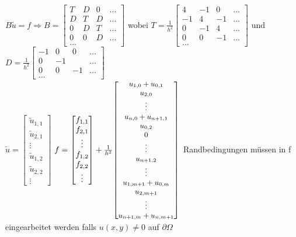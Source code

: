 $B \tilde{u} = f \Rightarrow B= \begin{bmatrix}
    T & D & 0 & \ldots \\
    D & T & D & \ldots \\
    0 & D & T & \ldots \\
    0 & 0 & D & \ldots \\
    \ldots
  \end{bmatrix}$
wobei $T=\frac{1}{h^2}\begin{bmatrix}
    4  & -1 & 0  & \ldots \\
    -1 & 4  & -1 & \ldots \\
    0  & -1 & 4  & \ldots \\
    0  & 0  & -1 & \ldots \\
    \ldots
  \end{bmatrix}$
und $D=\frac{1}{h^2}\begin{bmatrix}
    -1 & 0  & 0  & \ldots \\
    0  & -1 &    & \ldots \\
    0  & 0  & -1 & \ldots \\
    \ldots
  \end{bmatrix}$\\
$\tilde{u}=\begin{bmatrix}
    \tilde{u}_{1,1} \\
    \tilde{u}_{2,1} \\
    \vdots          \\
    \tilde{u}_{1,2} \\
    \tilde{u}_{2,2} \\
    \vdots
  \end{bmatrix}$
$f=\begin{bmatrix}
    f_{1,1} \\
    f_{2,1} \\
    \vdots  \\
    f_{1,2} \\
    f_{2,2} \\
    \vdots
  \end{bmatrix} +
  \frac{1}{h^2}{\small\begin{bmatrix}
      u_{1,0} + u_{0,1}  \\
      u_{2,0}            \\
      \vdots             \\
      u_{n,0}+u_{n+1,1}  \\
      u_{0,2}            \\
      0                  \\
      \vdots             \\
      u_{n+1,2}          \\
      \vdots             \\
      u_{1,m+1}+u_{0, m} \\
      u_{2,m+1}          \\
      \vdots             \\
      u_{n+1,m}+u_{n, m+1}
    \end{bmatrix}}$
Randbedingungen müssen in f eingearbeitet werden falls $u(x,y) \neq 0$ auf $\partial\Omega$


